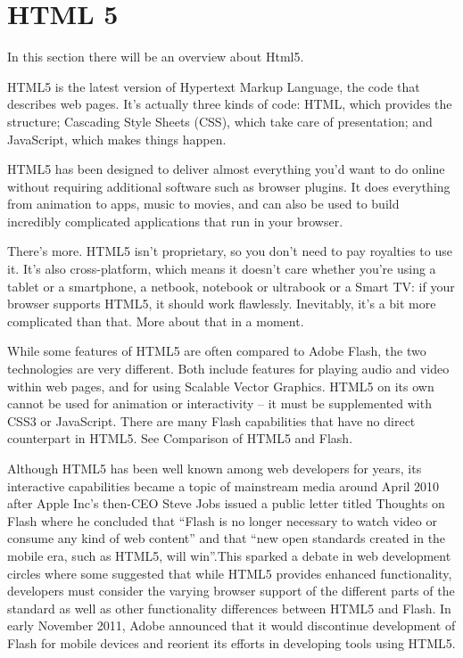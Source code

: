 \section{HTML 5}
\label{sec:TCH_html5}

In this section there will be an overview about Html5.

HTML5 is the latest version of Hypertext Markup Language, the code that describes web pages. It's actually three kinds of code: HTML, which provides the structure; Cascading Style Sheets (CSS), which take care of presentation; and JavaScript, which makes things happen.

HTML5 has been designed to deliver almost everything you'd want to do online without requiring additional software such as browser plugins. It does everything from animation to apps, music to movies, and can also be used to build incredibly complicated applications that run in your browser.

There's more. HTML5 isn't proprietary, so you don't need to pay royalties to use it. It's also cross-platform, which means it doesn't care whether you're using a tablet or a smartphone, a netbook, notebook or ultrabook or a Smart TV: if your browser supports HTML5, it should work flawlessly. Inevitably, it's a bit more complicated than that. More about that in a moment.

While some features of HTML5 are often compared to Adobe Flash, the two technologies are very different. Both include features for playing audio and video within web pages, and for using Scalable Vector Graphics. HTML5 on its own cannot be used for animation or interactivity – it must be supplemented with CSS3 or JavaScript. There are many Flash capabilities that have no direct counterpart in HTML5. See Comparison of HTML5 and Flash.

Although HTML5 has been well known among web developers for years, its interactive capabilities became a topic of mainstream media around April 2010 after Apple Inc's then-CEO Steve Jobs issued a public letter titled Thoughts on Flash where he concluded that ``Flash is no longer necessary to watch video or consume any kind of web content'' and that ``new open standards created in the mobile era, such as HTML5, will win''.This sparked a debate in web development circles where some suggested that while HTML5 provides enhanced functionality, developers must consider the varying browser support of the different parts of the standard as well as other functionality differences between HTML5 and Flash. In early November 2011, Adobe announced that it would discontinue development of Flash for mobile devices and reorient its efforts in developing tools using HTML5.
